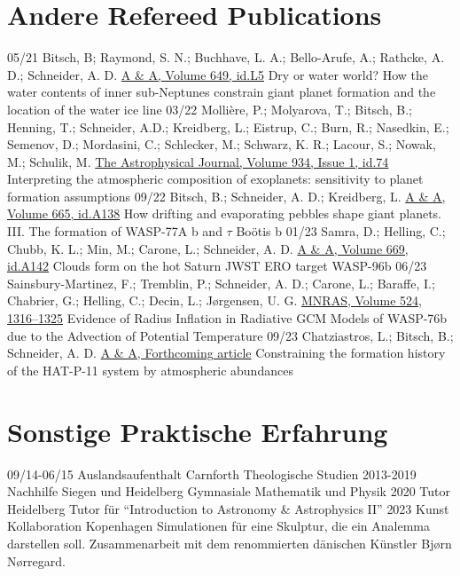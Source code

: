 \documentclass[]{friggeri-cv}
\begin{document}
\section{Andere Refereed Publications}
\begin{entrylist}
  \entry
    {05/21}
    {Bitsch, B; Raymond, S. N.; Buchhave, L. A.; Bello-Arufe, A.; Rathcke, A. D.; Schneider, A. D.}
    {\href{https://arxiv.org/abs/2104.11631}{A \& A, Volume 649, id.L5}}
    {Dry or water world? How the water contents of inner sub-Neptunes constrain giant planet formation and the location of the water ice line}
  \entry
    {03/22}
    {Mollière, P.; Molyarova, T.; Bitsch, B.; Henning, T.; Schneider, A.D.; Kreidberg, L.; Eistrup, C.; Burn, R.; Nasedkin, E.; Semenov, D.; Mordasini, C.; Schlecker, M.; Schwarz, K. R.; Lacour, S.; Nowak, M.; Schulik, M.}
    {\href{https://arxiv.org/abs/2204.13714}{The Astrophysical Journal, Volume 934, Issue 1, id.74}}
    {Interpreting the atmospheric composition of exoplanets: sensitivity to planet formation assumptions}
  \entry
  	{09/22}
  	{Bitsch, B.; Schneider, A. D.; Kreidberg, L.}
  	{\href{https://arxiv.org/abs/2207.06077}{A \& A, Volume 665, id.A138}}
  	{How drifting and evaporating pebbles shape giant planets. III. The formation of WASP-77A b and \(\tau \) Boötis b}
  \entry
  	{01/23}
  	{{Samra}, D.; {Helling}, C.; {Chubb}, K. L.; {Min}, M.; {Carone}, L.; {Schneider}, A. D.}
  	{\href{https://arxiv.org/abs/2211.00633}{A \& A, Volume 669, id.A142}}
  	{Clouds form on the hot Saturn JWST ERO target WASP-96b}
  \entry
  	{06/23}
  	{{Sainsbury-Martinez}, F.; {Tremblin}, P.; {Schneider}, A. D.; {Carone}, L.; {Baraffe}, I.; {Chabrier}, G.; {Helling}, C.; {Decin}, L.; {J{\o}rgensen}, U. G.}
  	{\href{https://arxiv.org/abs/2306.12352}{MNRAS, Volume 524, 1316–1325}}
  	{Evidence of Radius Inflation in Radiative GCM Models of WASP-76b due to the Advection of Potential Temperature}
  	\entry
  	{09/23}
  	{{Chatziastros}, L.; {Bitsch}, B.; {Schneider}, A. D.}
  	{\href{https://arxiv.org/abs/2310.12797}{A \& A, Forthcoming article}}
  	{Constraining the formation history of the HAT-P-11 system by atmospheric abundances}
\end{entrylist}

\newpage

\section{Sonstige Praktische Erfahrung}
\begin{entrylist}
	\entry
    {09/14-06/15}
    {Auslandsaufenthalt}
    {Carnforth}
    {Theologische Studien}
	\entry
    {2013-2019}
    {Nachhilfe}
    {Siegen und Heidelberg}
    {Gymnasiale Mathematik und Physik}
    \entry
    {2020}
    {Tutor}
    {Heidelberg}
    {Tutor für \enquote{Introduction to Astronomy \& Astrophysics II}}
    \entry
    {2023}
    {Kunst Kollaboration}
    {Kopenhagen}
    {Simulationen für eine Skulptur, die ein Analemma darstellen soll. Zusammenarbeit mit dem renommierten dänischen Künstler Bj{\o}rn N{\o}rregard.}
\end{entrylist}
\end{document}
